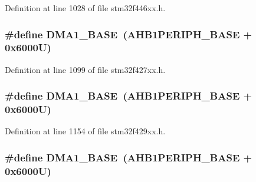 Definition at line 1028 of file stm32f446xx.\+h.

\subsubsection[{\texorpdfstring{D\+M\+A1\+\_\+\+B\+A\+SE}{DMA1_BASE}}]{\setlength{\rightskip}{0pt plus 5cm}\#define D\+M\+A1\+\_\+\+B\+A\+SE~({\bf A\+H\+B1\+P\+E\+R\+I\+P\+H\+\_\+\+B\+A\+SE} + 0x6000\+U)}\hypertarget{group___peripheral__memory__map_gab2d8a917a0e4ea99a22ac6ebf279bc72}{}\label{group___peripheral__memory__map_gab2d8a917a0e4ea99a22ac6ebf279bc72}


Definition at line 1099 of file stm32f427xx.\+h.

\subsubsection[{\texorpdfstring{D\+M\+A1\+\_\+\+B\+A\+SE}{DMA1_BASE}}]{\setlength{\rightskip}{0pt plus 5cm}\#define D\+M\+A1\+\_\+\+B\+A\+SE~({\bf A\+H\+B1\+P\+E\+R\+I\+P\+H\+\_\+\+B\+A\+SE} + 0x6000\+U)}\hypertarget{group___peripheral__memory__map_gab2d8a917a0e4ea99a22ac6ebf279bc72}{}\label{group___peripheral__memory__map_gab2d8a917a0e4ea99a22ac6ebf279bc72}


Definition at line 1154 of file stm32f429xx.\+h.

\subsubsection[{\texorpdfstring{D\+M\+A1\+\_\+\+B\+A\+SE}{DMA1_BASE}}]{\setlength{\rightskip}{0pt plus 5cm}\#define D\+M\+A1\+\_\+\+B\+A\+SE~({\bf A\+H\+B1\+P\+E\+R\+I\+P\+H\+\_\+\+B\+A\+SE} + 0x6000\+U)}\hypertarget{group___peripheral__memory__map_gab2d8a917a0e4ea99a22ac6ebf279bc72}{}\label{group___peripheral__memory__map_gab2d8a917a0e4ea99a22ac6ebf279bc72}


